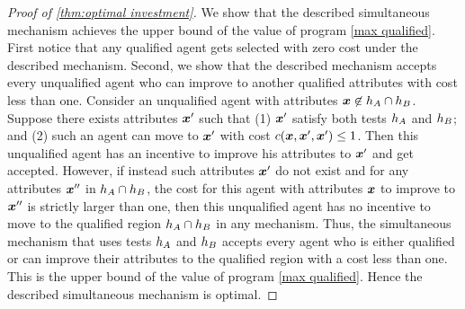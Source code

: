 \begin{proof}[Proof of \cref{thm:optimal investment}]
    We show that the described simultaneous mechanism achieves the upper bound of the value of program \ref{max qualified}. 
    First notice that any qualified agent gets selected with zero cost under the described mechanism.
    Second, we show that the described mechanism accepts every unqualified agent who can improve to another qualified attributes with cost less than one.
    Consider an unqualified agent with attributes $\boldsymbol{x}\not\in h_A \cap h_B$. 
    Suppose there exists attributes $\boldsymbol{x}'$ such that (1)  $\boldsymbol{x}'$ satisfy both tests $h_A$ and $h_B$; and (2)  such an agent can move to $\boldsymbol{x}'$ with cost $c(\boldsymbol{x}, \boldsymbol{x}', \boldsymbol{x}') \leq 1$.
    Then this unqualified agent has an incentive  to improve his attributes to $\boldsymbol{x}'$ and get accepted.  
    However, if instead such attributes $\boldsymbol{x}'$ do not exist and for any attributes $\boldsymbol{x}''$ in $h_A \cap h_B$, the cost for this agent with attributes $\boldsymbol{x}$ to improve to $\boldsymbol{x}''$ is strictly larger than one, then this unqualified agent has no incentive to move to the qualified region $h_A \cap h_B$ in any mechanism.
    Thus, the simultaneous mechanism that uses tests $h_A$ and $h_B$ accepts every agent who is either qualified or can improve their attributes to the qualified region with a cost less than one. 
    This is the upper bound of the value of program \ref{max qualified}.
    Hence the described simultaneous mechanism is optimal.
\end{proof}